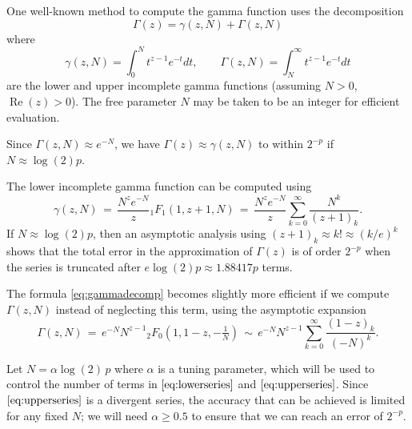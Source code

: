 \documentclass[reqno]{amsart}
\theoremstyle{definition}
\begin{document}

One well-known method to compute the gamma function \cite{Brent1976,Brent1978,borwein1987pi}
uses the decomposition
\begin{equation}
\Gamma(z) = \gamma(z,N) + \Gamma(z,N)
\label{eq:gammadecomp}
\end{equation}
where
\begin{equation}
\gamma(z,N) = \int_0^N t^{z-1} e^{-t} dt, \quad \quad \Gamma(z,N) = \int_N^{\infty} t^{z-1} e^{-t} dt
\end{equation}
are the lower and upper incomplete gamma functions (assuming $N > 0$, $\operatorname{Re}(z) > 0$).
The free parameter $N$ may be taken to be an integer
for efficient evaluation.

Since $\Gamma(z,N) \approx e^{-N}$, we have 
$\Gamma(z) \approx \gamma(z,N)$ to within $2^{-p}$
if $N \approx \log(2) p$.

The lower incomplete gamma function can be computed using
\begin{equation}
\gamma(z,N) \,=\, \frac{N^z e^{-N}}{z} {}_1F_1(1, z+1, N) \,=\, \frac{N^z e^{-N}}{z} \sum_{k=0}^{\infty} \frac{N^k}{(z+1)_k}.
\label{eq:lowerseries}
\end{equation}
If $N \approx \log(2) p$, then an asymptotic analysis
using $(z+1)_k \approx k! \approx (k/e)^k$
shows that the total error in the approximation of $\Gamma(z)$ is of order $2^{-p}$
when the series is truncated after $e \log(2) p \approx 1.88417 p$ terms.

The formula \eqref{eq:gammadecomp} becomes slightly more efficient
if we compute
$\Gamma(z,N)$ instead of neglecting this term, using
the asymptotic expansion
\begin{equation}
\Gamma(z,N) \, = \, e^{-N} N^{z-1} {}_2F_0\left(1, 1-z, -\tfrac{1}{N}\right) \,\sim \, e^{-N} N^{z-1} \sum_{k=0}^{\infty} \frac{(1-z)_k}{(-N)^k}.
\label{eq:upperseries}
\end{equation}

Let $N = \alpha \log(2) \, p$ where $\alpha$ is a tuning parameter,
which will be used to control the number of terms in $\eqref{eq:lowerseries}$
and $\eqref{eq:upperseries}$.
Since $\eqref{eq:upperseries}$ is a divergent series,
the accuracy that can be achieved is limited for any fixed $N$;
we will need $\alpha \ge 0.5$ to ensure that we can reach
an error of $2^{-p}$.
\end{document}
